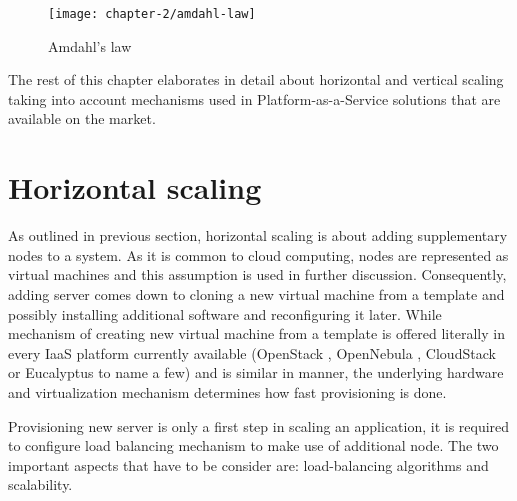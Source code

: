 \begin{figure}[!ht]
  \begin{center}
    \texttt{[image: chapter-2/amdahl-law]}
  \end{center}
  \caption{Amdahl's law}
  \label{ch2:amdahl-law}
\end{figure}

The rest of this chapter elaborates in detail about horizontal and vertical scaling taking into account mechanisms used in Platform-as-a-Service solutions that are available on the market.

\newpage
\section{Horizontal scaling}
As outlined in previous section, horizontal scaling is about adding supplementary nodes to a system. As it is common to cloud computing, nodes are represented as virtual machines and this assumption is used in further discussion. Consequently, adding server comes down to cloning a new virtual machine from a template and possibly installing additional software and reconfiguring it later. While mechanism of creating new virtual machine from a template is offered literally in every IaaS platform currently available (OpenStack \cite{OpenStack}, OpenNebula \cite{OpenNebula}, CloudStack \cite{CloudStack} or Eucalyptus \cite{Eucalyptus} to name a few) and is similar in manner, the underlying hardware and virtualization mechanism determines how fast provisioning is done. 

Provisioning new server is only a first step in scaling an application, it is required to configure load balancing mechanism to make use of additional node. The two important aspects that have to be consider are: load-balancing algorithms and scalability.

